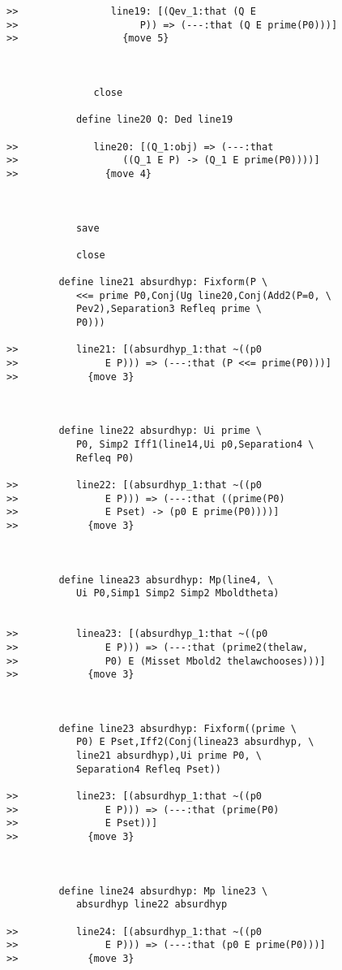 \documentclass[12pt]{article}
\begin{document}
\begin{verbatim}
>>                line19: [(Qev_1:that (Q E
>>                     P)) => (---:that (Q E prime(P0)))]
>>                  {move 5}



               close

            define line20 Q: Ded line19

>>             line20: [(Q_1:obj) => (---:that
>>                  ((Q_1 E P) -> (Q_1 E prime(P0))))]
>>               {move 4}



            save

            close

         define line21 absurdhyp: Fixform(P \
            <<= prime P0,Conj(Ug line20,Conj(Add2(P=0, \
            Pev2),Separation3 Refleq prime \
            P0)))

>>          line21: [(absurdhyp_1:that ~((p0
>>               E P))) => (---:that (P <<= prime(P0)))]
>>            {move 3}



         define line22 absurdhyp: Ui prime \
            P0, Simp2 Iff1(line14,Ui p0,Separation4 \
            Refleq P0)

>>          line22: [(absurdhyp_1:that ~((p0
>>               E P))) => (---:that ((prime(P0)
>>               E Pset) -> (p0 E prime(P0))))]
>>            {move 3}



         define linea23 absurdhyp: Mp(line4, \
            Ui P0,Simp1 Simp2 Simp2 Mboldtheta)


>>          linea23: [(absurdhyp_1:that ~((p0
>>               E P))) => (---:that (prime2(thelaw,
>>               P0) E (Misset Mbold2 thelawchooses)))]
>>            {move 3}



         define line23 absurdhyp: Fixform((prime \
            P0) E Pset,Iff2(Conj(linea23 absurdhyp, \
            line21 absurdhyp),Ui prime P0, \
            Separation4 Refleq Pset))

>>          line23: [(absurdhyp_1:that ~((p0
>>               E P))) => (---:that (prime(P0)
>>               E Pset))]
>>            {move 3}



         define line24 absurdhyp: Mp line23 \
            absurdhyp line22 absurdhyp

>>          line24: [(absurdhyp_1:that ~((p0
>>               E P))) => (---:that (p0 E prime(P0)))]
>>            {move 3}




\end{verbatim}
\end{document}
